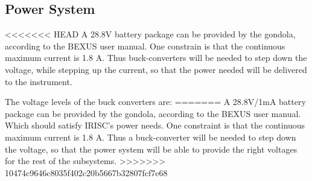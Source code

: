 \pagebreak
\subsection{Power System}
<<<<<<< HEAD
A 28.8V battery package can be provided by the gondola, according to the BEXUS user manual. One constrain is that the continuous maximum current is 1.8 A. Thus buck-converters will be needed to step down the voltage, while stepping up the current, so that the power needed will be delivered to the instrument. 

The voltage levels of the buck converters are: 
=======
A 28.8V/1mA battery package can be provided by the gondola, according to the BEXUS user manual. Which should satisfy IRISC's power needs. One constraint is that the continuous maximum current is 1.8 A. Thus a buck-converter will be needed to step down the voltage, so that the power system will be able to provide the right voltages for the rest of the subsystems.  
>>>>>>> 10474c9646c8035f402c20b5667b32807fcf7e68





\raggedbottom
